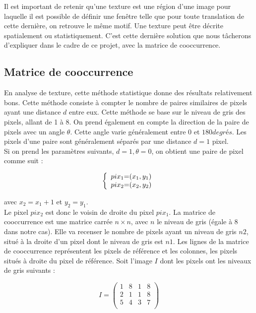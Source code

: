 Il est important de retenir qu'une texture est une région d'une image pour laquelle il est possible de définir une fenêtre telle que pour toute translation de cette dernière, on retrouve le même motif. Une texture peut être décrite spatialement ou statistiquement. C'est cette dernière solution que nous tâcherons d'expliquer dans le cadre de ce projet, avec la matrice de cooccurrence.

\subsection{Matrice de cooccurrence}

En analyse de texture, cette méthode statistique donne des résultats relativement bons. Cette méthode consiste à compter le nombre de paires similaires de pixels ayant une distance $d$ entre eux. Cette méthode se base sur le niveau de gris des pixels, allant de 1 à 8. On prend également en compte la direction de la paire de pixels avec un angle $\theta$. Cette angle varie généralement entre $0$ et $180 degrés$. Les pixels d'une paire sont généralement séparés par une distance $d=1$ pixel.\\

Si on prend les paramètres suivants, $d=1, \theta = 0$, on obtient une paire de pixel comme suit :

\[
 \left \{
 \begin{array}{c @{=} c}
     pix_1 & (x_1, y_1) \\
     pix_2 & (x_2, y_2) \\
 \end{array}
 \right.
\]

avec $x_2 = x_1 + 1$ et $y_2 = y_1$.\\

Le pixel $pix_2$ est donc le voisin de droite du pixel $pix_1$. La matrice de cooccurrence est une matrice carrée $n\times n$, avec $n$ le niveau de gris (égale à 8 dans notre cas). Elle va recenser le nombre de pixels ayant un niveau de gris $n2$, situé à la droite d'un pixel dont le niveau de gris est $n1$. Les lignes de la matrice de cooccurrence représentent les pixels de référence et les colonnes, les pixels situés à droite du pixel de référence. Soit l'image $I$ dont les pixels ont les niveaux de gris suivants :

\[
 I = \begin{pmatrix}
     1 & 8 & 1 & 8 \\
     2 & 1 & 1 & 8 \\
     5 & 4 & 3 & 7 \\     
 \end{pmatrix}
\]

